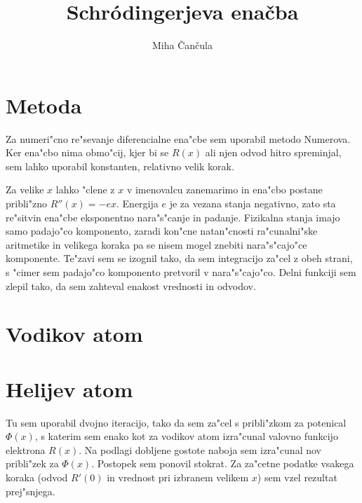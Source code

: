 \documentclass[a4paper,10pt]{article}
\title{Schr\' odingerjeva ena\v cba}
\author{Miha \v Can\v cula}
\begin{document}
\maketitle

\section{Metoda}

Za numeri"cno re"sevanje diferencialne ena"cbe sem uporabil metodo Numerova. Ker ena"cbo nima obmo"cij, kjer bi se $R(x)$ ali njen odvod hitro spreminjal, sem lahko uporabil konstanten, relativno velik korak. 

Za velike $x$ lahko "clene z $x$ v imenovalcu zanemarimo in ena"cbo postane pribli"zno $R''(x) = -ex$. Energija $e$ je za vezana stanja negativno, zato sta re"sitvin ena"cbe eksponentno nara"s"canje in padanje. Fizikalna stanja imajo samo padajo"co komponento, zaradi kon"cne natan"cnosti ra"cunalni"ske aritmetike in velikega koraka pa se nisem mogel znebiti nara"s"cajo"ce komponente. Te"zavi sem se izognil tako, da sem integracijo za"cel z obeh strani, s "cimer sem padajo"co komponento pretvoril v nara"s"cajo"co. Delni funkciji sem zlepil tako, da sem zahteval enakost vrednosti in odvodov. 

\section{Vodikov atom}

\begin{figure}[h]
 
\end{figure}

\section{Helijev atom}

Tu sem uporabil dvojno iteracijo, tako da sem za"cel s pribli"zkom za potenical $\Phi(x)$, s katerim sem enako kot za vodikov atom izra"cunal valovno funkcijo elektrona $R(x)$. Na podlagi dobljene gostote naboja sem izra"cunal nov pribli"zek za $\Phi(x)$. Postopek sem ponovil stokrat. Za za"cetne podatke vsakega koraka (odvod $R'(0)$ in vrednost pri izbranem velikem $x$) sem vzel rezultat prej"snjega. 
\end{document}
